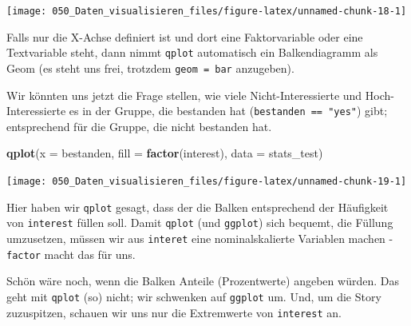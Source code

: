 \documentclass[12pt,ngerman,]{book}
\makeatletter
\newenvironment{Shaded}{\begin{snugshade}}{\end{snugshade}}
\newcommand{\KeywordTok}[1]{\textcolor[rgb]{0.13,0.29,0.53}{\textbf{#1}}}
\newcommand{\DataTypeTok}[1]{\textcolor[rgb]{0.13,0.29,0.53}{#1}}
\newcommand{\DecValTok}[1]{\textcolor[rgb]{0.00,0.00,0.81}{#1}}
\newcommand{\StringTok}[1]{\textcolor[rgb]{0.31,0.60,0.02}{#1}}
\newcommand{\OperatorTok}[1]{\textcolor[rgb]{0.81,0.36,0.00}{\textbf{#1}}}
\newcommand{\NormalTok}[1]{#1}
\newenvironment{kframe}{%
\medskip{}
\setlength{\fboxsep}{.8em}
 \def\at@end@of@kframe{}%
 \ifinner\ifhmode%
  \def\at@end@of@kframe{\end{minipage}}%
  \begin{minipage}{\columnwidth}%
 \fi\fi%
 \def\FrameCommand##1{\hskip\@totalleftmargin \hskip-\fboxsep
 \colorbox{shadecolor}{##1}\hskip-\fboxsep
     \hskip-\linewidth \hskip-\@totalleftmargin \hskip\columnwidth}%
 \MakeFramed {\advance\hsize-\width
   \@totalleftmargin\z@ \linewidth\hsize
   \@setminipage}}%
 {\par\unskip\endMakeFramed%
 \at@end@of@kframe}
\renewenvironment{Shaded}{\begin{kframe}}{\end{kframe}}
\theoremstyle{definition}
\theoremstyle{definition}
\theoremstyle{remark}
\makeatother
\begin{document}
\begin{center}\texttt{[image: 050\_Daten\_visualisieren\_files/figure-latex/unnamed-chunk-18-1]} \end{center}

Falls nur die X-Achse definiert ist und dort eine Faktorvariable oder
eine Textvariable steht, dann nimmt \texttt{qplot} automatisch ein
Balkendiagramm als Geom (es steht uns frei, trotzdem
\texttt{geom\ =\ bar} anzugeben).

Wir könnten uns jetzt die Frage stellen, wie viele Nicht-Interessierte
und Hoch-Interessierte es in der Gruppe, die bestanden hat
(\texttt{bestanden\ ==\ "yes"}) gibt; entsprechend für die Gruppe, die
nicht bestanden hat.

\begin{Shaded}
\begin{Highlighting}[]

  
\KeywordTok{qplot}\NormalTok{(}\DataTypeTok{x =}\NormalTok{ bestanden, }\DataTypeTok{fill =} \KeywordTok{factor}\NormalTok{(interest), }\DataTypeTok{data =}\NormalTok{ stats_test)}
\end{Highlighting}
\end{Shaded}

\begin{center}\texttt{[image: 050\_Daten\_visualisieren\_files/figure-latex/unnamed-chunk-19-1]} \end{center}

Hier haben wir \texttt{qplot} gesagt, dass der die Balken entsprechend
der Häufigkeit von \texttt{interest} füllen soll. Damit \texttt{qplot}
(und \texttt{ggplot}) sich bequemt, die Füllung umzusetzen, müssen wir
aus \texttt{interet} eine nominalskalierte Variablen machen -
\texttt{factor} macht das für uns.

Schön wäre noch, wenn die Balken Anteile (Prozentwerte) angeben würden.
Das geht mit \texttt{qplot} (so) nicht; wir schwenken auf
\texttt{ggplot} um. Und, um die Story zuzuspitzen, schauen wir uns nur
die Extremwerte von \texttt{interest} an.

\begin{Shaded}
\end{Shaded}
\end{document}
